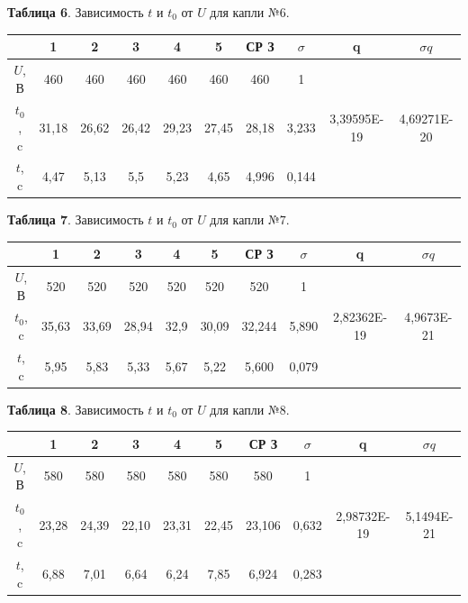 \documentclass[11pt,a4paper]{article}
\begin{document}
\begin{table}
	\begin{center}
		\textbf{Таблица 6}. Зависимость $t$ и $t_0$ от $U$ для капли $№6$.\\
	\begin{tabular}{|c|c|c|c|c|c|c|c|c|c|}
		
			\hline
			 & \textbf{1} & \textbf{2} & \textbf{3} &\textbf{4} &\textbf{5} & СР З & $\sigma$  & q& $\sigma q$ \\ \hline
			$U$, В & 460 & 460 & 460 & 460 & 460 &  460 & 1  \\ \hline
			$t_0$, c  & 31,18 & 26,62 & 26,42 & 29,23 & 27,45 &  28,18 & 3,233 & 3,39595E-19
 & 4,69271E-20
\\ \hline
			$t$, c   & 4,47 & 5,13 & 5,5 & 5,23 & 4,65 & 4,996 & 0,144\\ \hline
	\end{tabular}
	\end{center}
\end{table}
\space\begin{table}
	\begin{center}
		\textbf{Таблица 7}. Зависимость $t$ и $t_0$ от $U$ для капли $№7$.\\
	\begin{tabular}{|c|c|c|c|c|c|c|c|c|c|}
		
			\hline
			 & \textbf{1} & \textbf{2} & \textbf{3} &\textbf{4} &\textbf{5} & СР З & $\sigma$  & q& $\sigma q$ \\ \hline
			$U$, В & 520 & 520 & 520 & 520 & 520 &  520 & 1  \\ \hline
			$t_0$, c  & 35,63 & 33,69 & 28,94 & 32,9 & 30,09 &  32,244 & 5,890 & 2,82362E-19
 & 4,9673E-21
\\ \hline
			$t$, c   & 5,95 & 5,83 & 5,33 & 5,67 & 5,22 & 5,600 & 0,079\\ \hline
	\end{tabular}
	\end{center}
\end{table}
\space\begin{table}
	\begin{center}
		\textbf{Таблица 8}. Зависимость $t$ и $t_0$ от $U$ для капли $№8$.\\
	\begin{tabular}{|c|c|c|c|c|c|c|c|c|c|}
		
			\hline
			 & \textbf{1} & \textbf{2} & \textbf{3} &\textbf{4} &\textbf{5} & СР З & $\sigma$  & q& $\sigma q$ \\ \hline
			$U$, В & 580 & 580 & 580 & 580 & 580 &  580 &  1 \\ \hline
			$t_0$, c  & 23,28 & 24,39 & 22,10 & 23,31 & 22,45 &  23,106 & 0,632 & 2,98732E-19
 & 5,1494E-21
\\ \hline
			$t$, c   & 6,88 & 7,01 & 6,64 & 6,24 & 7,85 & 6,924 & 0,283 \\ \hline
	\end{tabular}
	\end{center}
\end{table}
\end{document}
